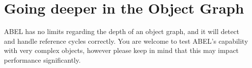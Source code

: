 \documentclass[a4paper,12pt]{report}
\begin{document}
% 
 
\section{Going deeper in the Object Graph}
\label{sec:going_deeper_in_object_graph}
ABEL has no limits regarding the depth of an object graph, and it will detect and handle reference cycles correctly. 
You are welcome to test ABEL's capability with very complex objects, however please keep in mind that this may impact performance significantly.

\end{document}
